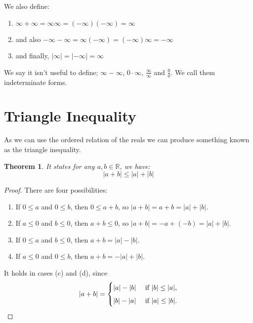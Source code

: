 \documentclass{article}
\newcommand{\R}{\mathbb{R}}
\newtheorem{theorem}{Theorem}
\begin{document}
We also define:
\begin{enumerate}
  \item $\infty + \infty = \infty\infty = (-\infty)(-\infty) = \infty$\\
  \item and also $- \infty - \infty = \infty(-\infty) = (-\infty)\infty = -\infty$\\
  \item and finally, $|\infty| = |-\infty| = \infty$
\end{enumerate}

We say it isn't useful to define; $\infty - \infty$, $0 \cdot \infty$, $\displaystyle{\frac{\infty}{\infty}}$ and $\displaystyle{\frac{0}{0}}$. We call them indeterminate forms.

\section{Triangle Inequality}
As we can use the ordered relation of the reals we can produce something known as the {\color{blue} triangle inequality}.
\begin{theorem}
  It states for any $a, b \in \R$, we have:
  $$ |a + b| \le |a| + |b|$$
\end{theorem}
\begin{proof}
  There are four possibilities:
  \begin{enumerate}
    \item If $0 \le a$ and $0 \le b$, then $0 \le a + b$, so $|a + b| = a + b = |a| + |b|$.
    \item If $a \le 0$ and $b \le 0$, then $a + b \le 0$, so $|a + b| = -a + (-b) = |a| + |b|$.
    \item If $0 \le a$ and $b \le 0$, then $a + b = |a| - |b|$.
    \item If $a \le 0$ and $0 \le b$, then $a + b = -|a| + |b|$.
  \end{enumerate}

It holds in cases (c) and (d), since
$$ |a + b| = \begin{cases}
|a| - |b| & \text{ if } |b| \le |a|,\vspace{5px}\\
|b| - |a| & \text{ if } |a| \le |b|.\\
\end{cases}
 $$
\end{proof}
\end{document}
